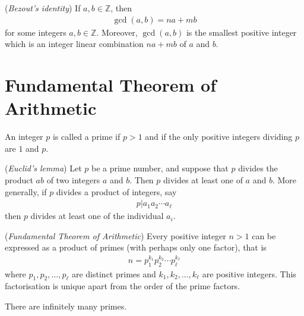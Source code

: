 \documentclass[a4paper, 12pt]{book} %
\begin{document}
\begin{theorem}
    (\emph{Bezout's identity}) If $a, b \in \mathbb{Z}$, then
    \begin{align}
        \gcd(a, b) = na + mb
    \end{align} 
    for some integers $a, b \in \mathbb{Z}$. Moreover, $\gcd(a, b)$ is the smallest positive integer which is an integer linear combination $na + mb$ of $a$ and $b$.
\end{theorem}


\section{Fundamental Theorem of Arithmetic}


\begin{definition}
    An integer $p$ is called a prime if $p > 1$ and if the only positive integers dividing $p$ are $1$ and $p$.
\end{definition}


\begin{lemma}
    (\emph{Euclid's lemma}) 
    Let $p$ be a prime number, and suppose that $p$ divides the product $ab$ of two integers $a$ and $b$. Then $p$ divides at least one of $a$ and $b$. More generally, if $p$ divides a product of integers, say
    \begin{align}
        p|a_1 a_2 \cdots a_\ell
    \end{align}
    then $p$ divides at least one of the individual $a_i$.
\end{lemma}
\begin{theorem}
    (\emph{Fundamental Theorem of Arithmetic}) Every positive integer $n > 1$ can be expressed as a product of primes (with perhaps only one factor), that is
    \begin{align}
        n = p_1^{k_1} p_2^{k_2} \cdots p_{\ell}^{k_\ell}
    \end{align}
    where $p_1, p_2, \ldots, p_\ell$ are distinct primes and $k_1, k_2, \ldots, k_\ell$ are positive integers. This factorisation is unique apart from the order of the prime factors.
\end{theorem}

\begin{theorem}
    There are infinitely many primes.
\end{theorem}
\end{document}
